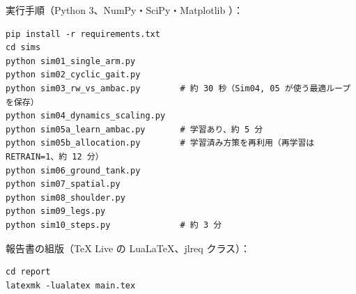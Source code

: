 \noindent 実行手順（Python 3、NumPy・SciPy・Matplotlib \cite{R39,R40,R41}）：
\begin{Verbatim}[fontsize=\small,frame=single]
pip install -r requirements.txt
cd sims
python sim01_single_arm.py
python sim02_cyclic_gait.py
python sim03_rw_vs_ambac.py        # 約 30 秒（Sim04, 05 が使う最適ループを保存）
python sim04_dynamics_scaling.py
python sim05a_learn_ambac.py       # 学習あり、約 5 分
python sim05b_allocation.py        # 学習済み方策を再利用（再学習は RETRAIN=1、約 12 分）
python sim06_ground_tank.py
python sim07_spatial.py
python sim08_shoulder.py
python sim09_legs.py
python sim10_steps.py              # 約 3 分
\end{Verbatim}

\noindent 報告書の組版（TeX Live の LuaLaTeX、jlreq クラス）：
\begin{Verbatim}[fontsize=\small,frame=single]
cd report
latexmk -lualatex main.tex
\end{Verbatim}
